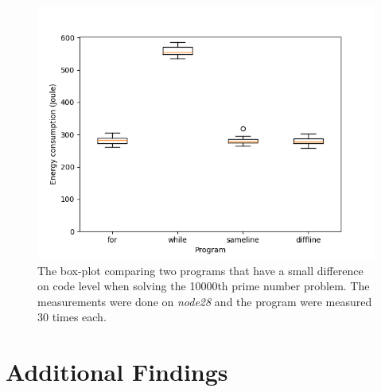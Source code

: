 \begin{figure}[h]
    \centering
    \includegraphics[width=.6\textwidth]{graphs/codelevel.png}
    \caption{The box-plot comparing two programs that have a small difference on code level when solving the 10000th prime number problem. The measurements were done on \textit{node28} and the program were measured 30 times each.}
    \label{fig:box-code}
\end{figure}


\section{Additional Findings}
